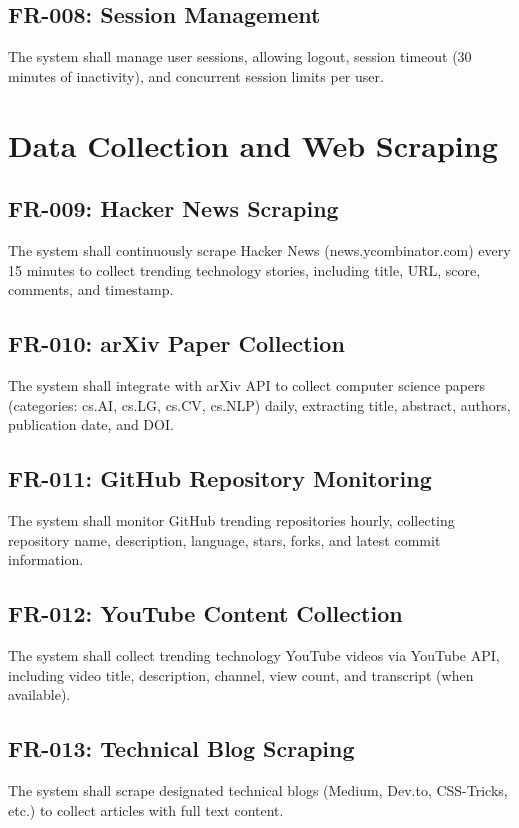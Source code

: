 \documentclass{report}
\begin{document}
\subsection{FR-008: Session Management}
The system shall manage user sessions, allowing logout, session timeout (30 minutes of inactivity), and concurrent session limits per user.

\section{Data Collection and Web Scraping}

\subsection{FR-009: Hacker News Scraping}
The system shall continuously scrape Hacker News (news.ycombinator.com) every 15 minutes to collect trending technology stories, including title, URL, score, comments, and timestamp.

\subsection{FR-010: arXiv Paper Collection}
The system shall integrate with arXiv API to collect computer science papers (categories: cs.AI, cs.LG, cs.CV, cs.NLP) daily, extracting title, abstract, authors, publication date, and DOI.

\subsection{FR-011: GitHub Repository Monitoring}
The system shall monitor GitHub trending repositories hourly, collecting repository name, description, language, stars, forks, and latest commit information.

\subsection{FR-012: YouTube Content Collection}
The system shall collect trending technology YouTube videos via YouTube API, including video title, description, channel, view count, and transcript (when available).

\subsection{FR-013: Technical Blog Scraping}
The system shall scrape designated technical blogs (Medium, Dev.to, CSS-Tricks, etc.) to collect articles with full text content.
\end{document}
